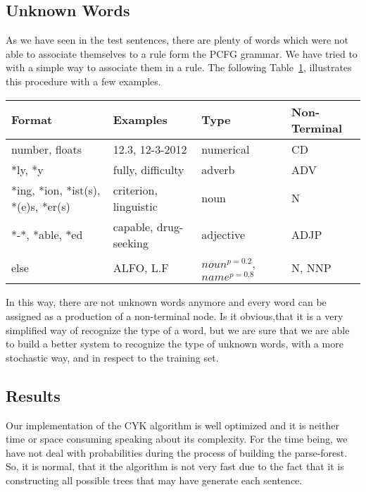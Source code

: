 \documentclass[a4paper,11pt]{article}
\begin{document}
\subsection{Unknown Words}
As we have seen in the test sentences, there are plenty of words which were not able to associate themselves to a rule form the PCFG grammar. We have tried to with a simple way to associate them in a rule. The following Table~\ref{unknown}, illustrates this procedure with a few examples.
\begin{table}[h!]
\label{unknown}
\begin{center}
    \begin{tabular}{|l|l|l|l|}
\hline
        \textbf{Format} & \textbf{Examples} & \textbf{Type} & \textbf{Non-Terminal} \\
		\hline
        number, floats & 12.3, 12-3-2012 & numerical & CD \\ \hline
        *ly, *y & fully, difficulty & adverb & ADV \\ \hline
		*ing, *ion, *ist(s), *(e)s, *er(s) & criterion, linguistic & noun & N \\ \hline
        *-*, *able, *ed & capable, drug-seeking & adjective &  ADJP  \\ \hline
		else & ALFO, L.F & $noun^{p=0.2}$, $name^{p=0.8}$  & N, NNP \\ \hline
    \end{tabular}
\end{center}
\end{table}
In this way, there are not unknown words anymore and every word can be assigned as a production of a non-terminal node. Is it obvious,that it is a very simplified way of recognize the type of a word, but we are sure that we are able to build a better system to recognize the type of unknown words, with a more stochastic way, and in respect to the training set.

\subsection{Results}
Our implementation of the CYK algorithm is well optimized and it is neither time or space consuming speaking about its complexity. For the time being, we have not deal with probabilities during the process of building the parse-forest. So, it is normal, that it the algorithm is not very fast due to the fact that it is constructing all possible trees that may have generate each sentence.
\end{document}
